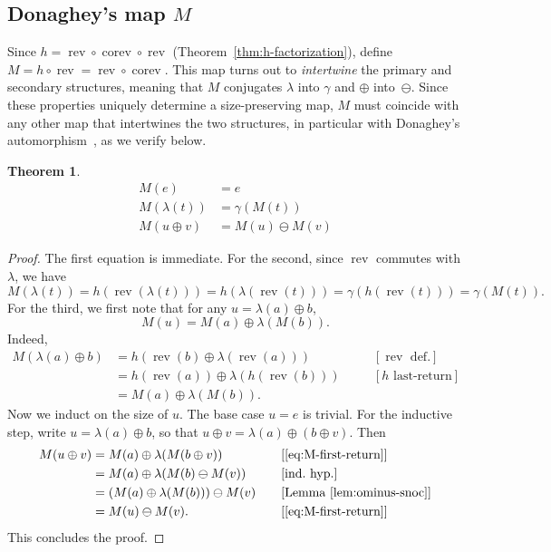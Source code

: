 \documentclass[a4paper,11pt]{article}
\newtheorem{theorem}{Theorem}[section]
\theoremstyle{definition}
\DeclareMathOperator{\rev}{rev}
\DeclareMathOperator{\corev}{corev}
\begin{document}
\subsection{Donaghey's map $M$}\label{sec:donaghey}

Since $h = \rev \circ \corev \circ \rev$
(Theorem~\ref{thm:h-factorization}), define
$M = h \circ \rev = \rev \circ \corev$.
This map turns out to \emph{intertwine} the primary and secondary
structures, meaning that $M$ conjugates $\lambda$ into
$\gamma$ and $\oplus$ into~$\ominus$.
Since these properties uniquely determine a
size-preserving map, $M$ must coincide with any other
map that intertwines the two structures, in particular
with Donaghey's automorphism~\cite{Donaghey80}, as we
verify below.

\begin{theorem}\label{thm:M-intertwine}
\begin{align*}
  M(e) &= e \\
  M(\lambda(t)) &= \gamma(M(t)) \\
  M(u \oplus v) &= M(u) \ominus M(v)
\end{align*}
\end{theorem}

\begin{proof}
The first equation is immediate. For the second,
since $\rev$ commutes with $\lambda$, we have
\[
  M(\lambda(t))
    = h(\rev(\lambda(t)))
    = h(\lambda(\rev(t)))
    = \gamma(h(\rev(t)))
    = \gamma(M(t)).
\]
For the third, we first note that for any
$u = \lambda(a) \oplus b$,
\begin{equation}\label{eq:M-first-return}
  M(u) = M(a) \oplus \lambda(M(b)).
\end{equation}
Indeed,
\begin{align*}
  M(\lambda(a) \oplus b)
    &= h(\rev(b) \oplus \lambda(\rev(a)))
      &\quad&[\rev\text{ def.}] \\
    &= h(\rev(a)) \oplus \lambda(h(\rev(b)))
      &&[h\text{ last-return}] \\
    &= M(a) \oplus \lambda(M(b)).
\end{align*}
Now we induct on the size of $u$. The base case $u = e$ is
trivial. For the inductive step, write $u = \lambda(a) \oplus b$, so
that $u \oplus v = \lambda(a) \oplus (b \oplus v)$. Then
\begin{align*}
  M(u \oplus v)
    &= M(a) \oplus \lambda(M(b \oplus v))
      &\quad&[\eqref{eq:M-first-return}] \\
    &= M(a) \oplus \lambda(M(b) \ominus M(v))
      &&[\text{ind.\ hyp.}] \\
    &= (M(a) \oplus \lambda(M(b))) \ominus M(v)
      &&[\text{Lemma~\ref{lem:ominus-snoc}}] \\
    &= M(u) \ominus M(v).
      &&[\eqref{eq:M-first-return}]
\end{align*}
This concludes the proof.
\end{proof}
\end{document}
